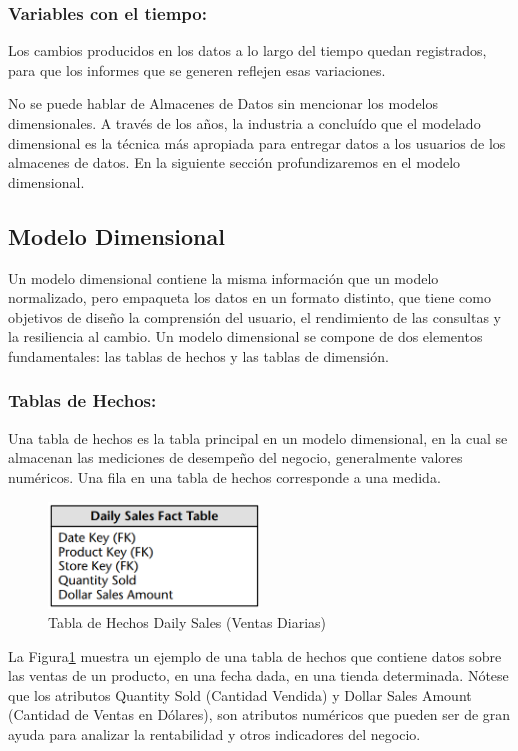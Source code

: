 \subsubsection{Variables con el tiempo:}
Los cambios producidos en los datos a lo largo del tiempo quedan registrados, para que los informes que se generen reflejen 
esas variaciones.


No se puede hablar de Almacenes de Datos sin mencionar los modelos dimensionales. A trav\'es de los a\~{n}os, la industria 
a conclu\'ido que el modelado dimensional es la t\'ecnica m\'as apropiada para entregar datos a los usuarios de los 
almacenes de datos. En la siguiente sección profundizaremos en el modelo dimensional.

\subsection{Modelo Dimensional}

Un modelo dimensional contiene la misma información que un modelo normalizado, pero empaqueta los datos en un formato 
distinto, que tiene como objetivos de diseño la comprensión del usuario, el rendimiento de las consultas y la resiliencia 
al cambio. Un modelo dimensional se compone de dos elementos fundamentales: las tablas de hechos y las tablas de dimensi\'on.
%
\subsubsection{Tablas de Hechos: }
%
Una tabla de hechos es la tabla principal en un modelo dimensional, en la cual se almacenan las mediciones de desempeño del 
negocio, generalmente valores num\'ericos\cite{kimball2011data}. Una fila en una tabla de hechos corresponde a una medida.
%
\begin{figure}[ht]
    \centering
    \includegraphics[width=0.5\textwidth]{../document/Graphics/hechos.png}
    \caption{Tabla de Hechos Daily Sales (Ventas Diarias) \cite{kimball2011data}}
    \label{fig:facts}
  \end{figure}
%

La Figura\ref{fig:facts} muestra un ejemplo de una tabla de hechos que contiene datos sobre las ventas de un producto, en una fecha dada, 
en una tienda determinada. N\'otese que los atributos Quantity Sold (Cantidad Vendida) y Dollar Sales Amount (Cantidad de 
Ventas en Dólares), son atributos num\'ericos que pueden ser de gran ayuda para analizar la rentabilidad y otros indicadores 
del negocio. 

